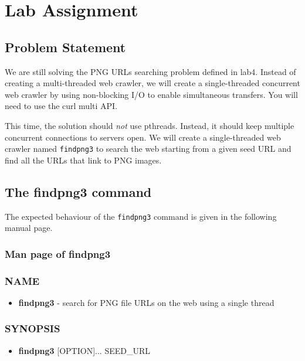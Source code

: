 \section{Lab Assignment}
\subsection{Problem Statement}
We are still solving the PNG URLs searching problem defined in lab4. Instead of creating a multi-threaded web crawler, we will create a single-threaded concurrent web crawler by using non-blocking I/O to enable simultaneous transfers. You will need to use the curl multi API.

This time, the solution should {\em not} use pthreads. Instead, it should keep multiple concurrent connections to servers open. We will create a single-threaded web crawler named \verb+findpng3+ to search the web starting from a given seed URL and find all the URLs that link to PNG images.

\subsection{The findpng3 command}
The expected behaviour of the \verb+findpng3+ command is given in the following manual page.
\subsubsection{Man page of findpng3}
\label{sec:findpng3_manpage}
\subsubsection*{NAME}
\begin{itemize}
	\item[]{\bf findpng3} - search for PNG file URLs on the web using a single thread
\end{itemize}
\subsubsection*{SYNOPSIS}
\begin{itemize}
	\item[]{\bf findpng3} [OPTION]... SEED\_URL
\end{itemize}

